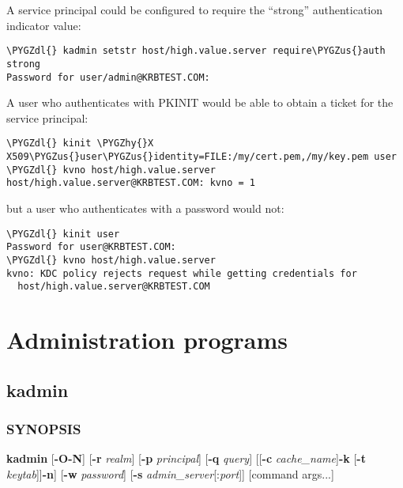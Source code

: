 \documentclass[letterpaper,10pt,english]{sphinxmanual}
\def\PYGZus{\char`\_}
\def\PYGZdl{\char`\$}
\def\PYGZhy{\char`\-}
\begin{document}
A service principal could be configured to require the ``strong''
authentication indicator value:

\begin{Verbatim}[commandchars=\\\{\}]
\PYGZdl{} kadmin setstr host/high.value.server require\PYGZus{}auth strong
Password for user/admin@KRBTEST.COM:
\end{Verbatim}

A user who authenticates with PKINIT would be able to obtain a ticket
for the service principal:

\begin{Verbatim}[commandchars=\\\{\}]
\PYGZdl{} kinit \PYGZhy{}X X509\PYGZus{}user\PYGZus{}identity=FILE:/my/cert.pem,/my/key.pem user
\PYGZdl{} kvno host/high.value.server
host/high.value.server@KRBTEST.COM: kvno = 1
\end{Verbatim}

but a user who authenticates with a password would not:

\begin{Verbatim}[commandchars=\\\{\}]
\PYGZdl{} kinit user
Password for user@KRBTEST.COM:
\PYGZdl{} kvno host/high.value.server
kvno: KDC policy rejects request while getting credentials for
  host/high.value.server@KRBTEST.COM
\end{Verbatim}


\chapter{Administration  programs}
\label{admin/admin_commands/index:administration-programs}\label{admin/admin_commands/index::doc}

\section{kadmin}
\label{admin/admin_commands/kadmin_local::doc}\label{admin/admin_commands/kadmin_local:kadmin}\label{admin/admin_commands/kadmin_local:kadmin-1}

\subsection{SYNOPSIS}
\label{admin/admin_commands/kadmin_local:synopsis}\label{admin/admin_commands/kadmin_local:kadmin-synopsis}
\textbf{kadmin}
{[}\textbf{-O}\textbar{}\textbf{-N}{]}
{[}\textbf{-r} \emph{realm}{]}
{[}\textbf{-p} \emph{principal}{]}
{[}\textbf{-q} \emph{query}{]}
{[}{[}\textbf{-c} \emph{cache\_name}{]}\textbar{}{[}\textbf{-k} {[}\textbf{-t} \emph{keytab}{]}{]}\textbar{}\textbf{-n}{]}
{[}\textbf{-w} \emph{password}{]}
{[}\textbf{-s} \emph{admin\_server}{[}:\emph{port}{]}{]}
{[}command args...{]}
\end{document}
